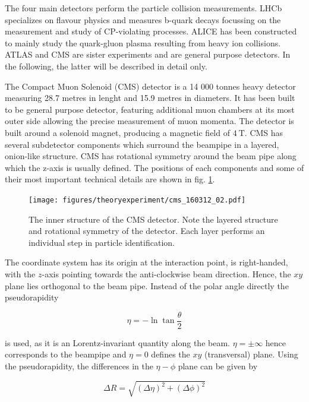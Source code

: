 The four main detectors perform the particle collision measurements. LHCb specializes on flavour physics and measures b-quark decays focussing on the measurement and study of CP-violating processes. ALICE has been constructed to mainly study the quark-gluon plasma resulting from heavy ion collisions. ATLAS and CMS are sister experiments and are general purpose detectors. In the following, the latter will be described in detail only.


The Compact Muon Solenoid (CMS) detector is a 14 000 tonnes heavy detector measuring 28.7 metres in lenght and 15.9 metres in diameters. It has been built to be general purpose detector, featuring additional muon chambers at its most outer side allowing the precise measurement of muon momenta. The detector is built around a solenoid magnet, producing a magnetic field of $\SI{4}{\tesla}$. CMS has several subdetector components which surround the beampipe in a layered, onion-like structure. CMS has rotational symmetry around the beam pipe along which the z-axis is usually defined. The positions of each components and some of their most important technical details are shown in fig. \ref{fig:cms_view}.

\begin{figure}[h!]
	\centering
	\texttt{[image: figures/theoryexperiment/cms\_160312\_02.pdf]}
	\caption{The inner structure of the CMS detector. Note the layered structure and rotational symmetry of the detector. Each layer performs an individual step in particle identification. \cite{Sakuma:2665537}}
	\label{fig:cms_view}
\end{figure}

The coordinate system has its origin at the interaction point, is right-handed, with the $z$-axis pointing towards the anti-clockwise beam direction. Hence, the $xy$ plane lies orthogonal to the beam pipe. Instead of the polar angle directly the pseudorapidity 

\begin{equation*}
	\eta = -\ln\tan\frac{\theta}{2}
\end{equation*}

is used, as it is an Lorentz-invariant quantity along the beam. $\eta = \pm\infty$ hence corresponds to the beampipe and $\eta = 0$ defines the $xy$ (transversal) plane. Using the pseudorapidity, the differences in the $\eta-\phi$ plane can be given by

\begin{equation*}
	\Delta R = \sqrt{\left(\Delta\eta\right)^2 + \left(\Delta\phi\right)^2}
\end{equation*}

